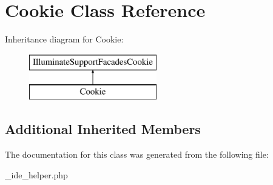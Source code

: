 \hypertarget{class_cookie}{}\section{Cookie Class Reference}
\label{class_cookie}
Inheritance diagram for Cookie\+:\begin{figure}[H]
\begin{center}
\leavevmode
\includegraphics[height=2.000000cm]{class_cookie}
\end{center}
\end{figure}
\subsection*{Additional Inherited Members}


The documentation for this class was generated from the following file\+:\begin{DoxyCompactItemize}
\item 
\+\_\+ide\+\_\+helper.\+php\end{DoxyCompactItemize}
